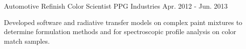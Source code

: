 \begin{cventries}
  \cventry
    {Automotive Refinish} %
    {Color Scientist} %
    {PPG Industries} %
    {Apr. 2012 - Jun. 2013} %
    {
      \begin{cvparagraph}
        Developed software and radiative transfer models on complex paint mixtures to determine formulation methods and for spectroscopic profile analysis on color match samples.
      \end{cvparagraph}
    }



\end{cventries}
